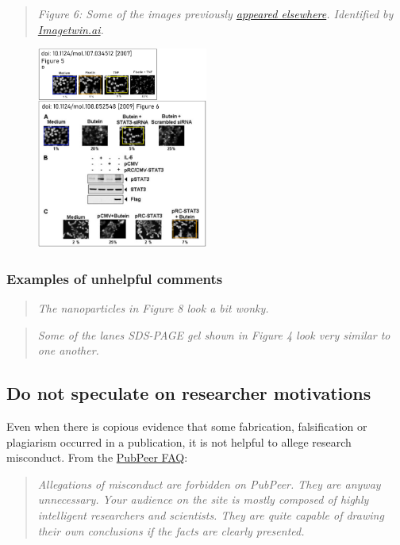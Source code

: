 \documentclass[letterpaper, 12pt]{article}
\begin{document}
\pagebreak
\begin{quote}
    \textit{Figure 6: Some of the images previously \href{https://pubpeer.com/publications/2E9CC5D00FDE41668A28B9622E64ED}{appeared elsewhere}. Identified by \href{https://imagetwin.ai}{Imagetwin.ai}.}
\end{quote}

\begin{figure}[h!tbp]
\centering
    \includegraphics[width=0.5\textwidth]{img/pubpeer/image-1729709836291.png}
\end{figure}

\subsubsection*{Examples of unhelpful comments}

\begin{quote}
    \textit{The nanoparticles in Figure 8 look a bit wonky.}
\end{quote}

\begin{quote}
    \textit{Some of the lanes SDS-PAGE gel shown in Figure 4 look very similar to one another.}
\end{quote}

\subsection*{Do not speculate on researcher motivations}

Even when there is copious evidence that some fabrication, falsification or plagiarism occurred in a publication, it is not helpful to allege research misconduct. From the \href{https://pubpeer.com/static/faq#4}{PubPeer FAQ}:

\begin{quote}
    \textit{Allegations of misconduct are forbidden on PubPeer. They are anyway unnecessary. Your audience on the site is mostly composed of highly intelligent researchers and scientists. They are quite capable of drawing their own conclusions if the facts are clearly presented.}
\end{quote}
\end{document}
